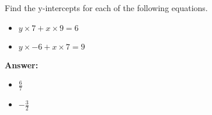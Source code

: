  Find the y-intercepts for each of the following equations. \begin{itemize}\item \( y \times 7 + x \times 9 = 6 \)\item \( y \times -6 + x \times 7 = 9 \)\end{itemize}

        \textbf{Answer:} \begin{itemize}\item \( \frac{6}{7} \)\item \( -\frac{3}{2} \)\end{itemize}
